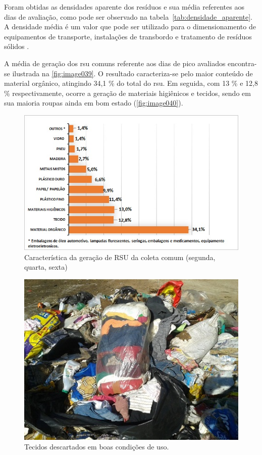 Foram obtidas as densidades aparente dos resíduos e sua média referentes aos dias de avaliação, como pode ser observado na tabela~\ref{tab:densidade_aparente}. A densidade média é um valor que pode ser utilizado para o dimensionamento de equipamentos de transporte, instalações de transbordo e tratamento de resíduos sólidos \cite{ibam:2001}.



A média de geração dos \gls{rsu} comuns referente aos dias de pico avaliados encontra-se ilustrada na \autoref{fig:image039}. O resultado caracteriza-se pelo maior conteúdo de material orgânico, atingindo 34,1 \% do total do \gls{rsu}. Em seguida, com 13 \% e 12,8 \% respectivamente, ocorre a geração de materiais higiênicos e tecidos, sendo em sua maioria roupas ainda em bom estado (\autoref{fig:image040}). 

\begin{figure}
	\centering
	\includegraphics[width=1\linewidth]{produtos/prodtres/image039}
	\caption{Característica da geração de RSU da coleta comum (segunda, quarta, sexta)}
	\label{fig:image039}
\end{figure}


\begin{figure}
	\centering
	\includegraphics[width=0.7\linewidth]{produtos/prodtres/image040}
	\caption{Tecidos descartados em boas condições de uso.}
	\label{fig:image040}
\end{figure}


